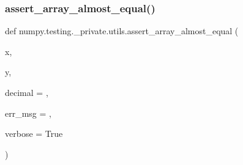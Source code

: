 \subsubsection{\texorpdfstring{assert\+\_\+array\+\_\+almost\+\_\+equal()}{assert\_array\_almost\_equal()}}
{\footnotesize\ttfamily def numpy.\+testing.\+\_\+private.\+utils.\+assert\+\_\+array\+\_\+almost\+\_\+equal (\begin{DoxyParamCaption}\item[{}]{x,  }\item[{}]{y,  }\item[{}]{decimal = {},  }\item[{}]{err\+\_\+msg = {\ttfamily \textquotesingle{}\textquotesingle{}},  }\item[{}]{verbose = {\ttfamily True} }\end{DoxyParamCaption})}

